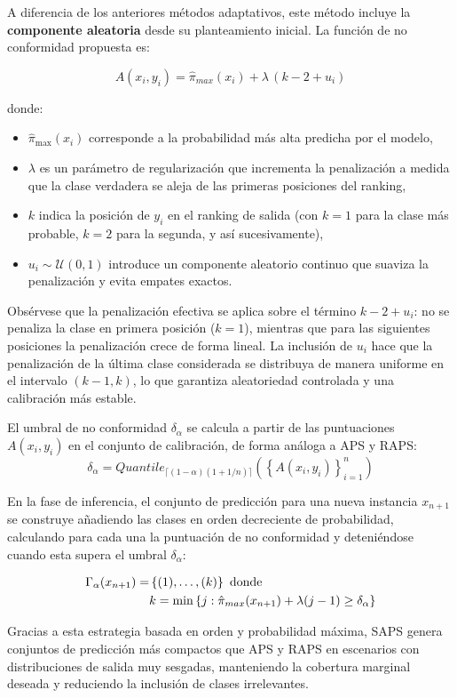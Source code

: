 A diferencia de los anteriores métodos adaptativos, este método incluye la \textbf{componente aleatoria} desde su planteamiento inicial. La función de no conformidad propuesta es:

$$
A(x_i, y_i) = \hat{\pi}_{max}(x_i) + \lambda \,(k - 2 + u_i)
$$

donde:  
\begin{itemize}
    \item $\hat{\pi}_{\max}(x_i)$ corresponde a la probabilidad más alta predicha por el modelo,  
    \item $\lambda$ es un parámetro de regularización que incrementa la penalización a medida que la clase verdadera se aleja de las primeras posiciones del ranking,  
    \item $k$ indica la posición de $y_i$ en el ranking de salida (con $k=1$ para la clase más probable, $k=2$ para la segunda, y así sucesivamente),  
    \item $u_i \sim \mathcal{U}(0,1)$ introduce un componente aleatorio continuo que suaviza la penalización y evita empates exactos.
\end{itemize}

Obsérvese que la penalización efectiva se aplica sobre el término $k - 2 + u_i$: no se penaliza la clase en primera posición ($k=1$), mientras que para las siguientes posiciones la penalización crece de forma lineal. La inclusión de $u_i$ hace que la penalización de la última clase considerada se distribuya de manera uniforme en el intervalo $(k-1, k)$, lo que garantiza aleatoriedad controlada y una calibración más estable.

El umbral de no conformidad $\delta_\alpha$ se calcula a partir de las puntuaciones $A(x_i, y_i)$ en el conjunto de calibración, de forma análoga a \acrshort{APS} y \acrshort{RAPS}:
$$
\delta_\alpha = Quantile_{\lceil (1-\alpha)(1+1/n) \rceil} \left( \left\{ A(x_i, y_i) \right\}_{i=1}^n \right)
$$

En la fase de inferencia, el conjunto de predicción para una nueva instancia $x_{n+1}$ se construye añadiendo las clases en orden decreciente de probabilidad, calculando para cada una la puntuación de no conformidad y deteniéndose cuando esta supera el umbral $\delta_\alpha$:

\begin{align*}
\Gamma_\alpha(x_{n+1}) = &\left\{ (1), \dots, (k) \right\} \ \textnormal{donde} \\
& k = \min \left\{ j : \hat{\pi}_{max}(x_{n+1}) + \lambda (j - 1) \ge \delta_\alpha \right\}
\end{align*}

Gracias a esta estrategia basada en orden y probabilidad máxima, \acrshort{SAPS} genera conjuntos de predicción más compactos que \acrshort{APS} y \acrshort{RAPS} en escenarios con distribuciones de salida muy sesgadas, manteniendo la cobertura marginal deseada y reduciendo la inclusión de clases irrelevantes.




